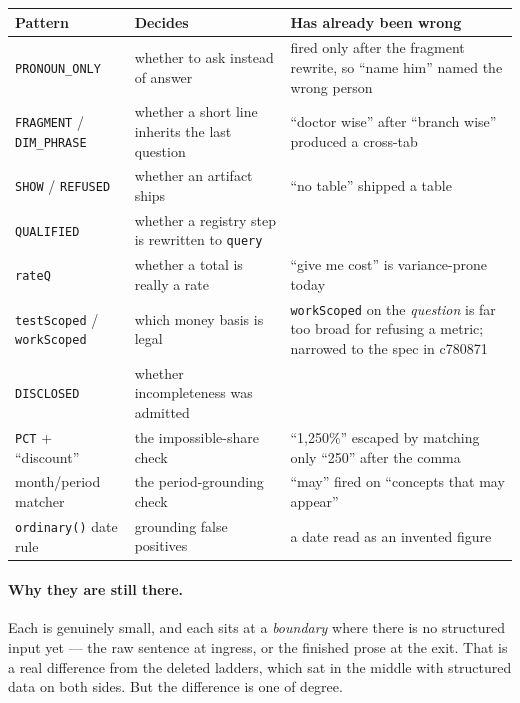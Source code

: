 \documentclass[11pt,a4paper]{report}
\newcommand{\code}[1]{\texttt{\small #1}}
\newcommand{\sha}[1]{{\ttfamily\small\color{slate}#1}}
\begin{document}
\begin{center}
\small
\begin{tabular}{@{}p{3.2cm}p{4.6cm}p{6.8cm}@{}}
\toprule
\textbf{Pattern} & \textbf{Decides} & \textbf{Has already been wrong}\\
\midrule
\code{PRONOUN\_ONLY} & whether to ask instead of answer & fired only after the fragment rewrite, so
 ``name him'' named the wrong person\\
\code{FRAGMENT} / \code{DIM\_PHRASE} & whether a short line inherits the last question & ``doctor
 wise'' after ``branch wise'' produced a cross-tab\\
\code{SHOW} / \code{REFUSED} & whether an artifact ships & ``no table'' shipped a table\\
\code{QUALIFIED} & whether a registry step is rewritten to \code{query} & \\
\code{rateQ} & whether a total is really a rate & ``give me cost'' is variance-prone today\\
\code{testScoped} / \code{workScoped} & which money basis is legal & \code{workScoped} on the
 \emph{question} is far too broad for refusing a metric; narrowed to the spec in \sha{c780871}\\
\code{DISCLOSED} & whether incompleteness was admitted & \\
\code{PCT} + ``discount'' & the impossible-share check & ``1,250\%'' escaped by matching only
 ``250'' after the comma\\
month/period matcher & the period-grounding check & ``may'' fired on ``concepts that may appear''\\
\code{ordinary()} date rule & grounding false positives & a date read as an invented figure\\
\bottomrule
\end{tabular}
\end{center}

\paragraph{Why they are still there.} Each is genuinely small, and each sits at a \emph{boundary}
where there is no structured input yet --- the raw sentence at ingress, or the finished prose at the
exit. That is a real difference from the deleted ladders, which sat in the middle with structured
data on both sides. But the difference is one of degree.
\end{document}
